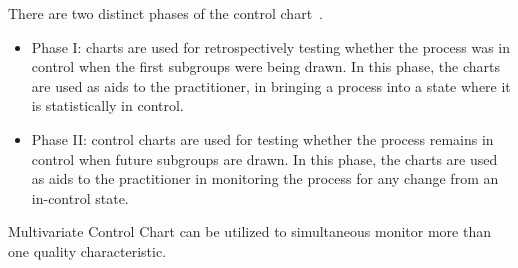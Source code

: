 There are two distinct phases of the control chart~\cite{bersimis2007multivariate}.

\begin{itemize}
\item Phase I: charts are used for retrospectively testing whether the process was in control when the first
subgroups were being drawn. In this phase, the charts are used as aids to the practitioner, in bringing a
process into a state where it is statistically in control.
\item Phase II: control charts are used for testing whether the process remains in control when future subgroups
are drawn. In this phase, the charts are used as aids to the practitioner in monitoring the process for any
change from an in-control state.
\end{itemize}

Multivariate Control Chart can be utilized to simultaneous monitor more than one quality characteristic. 




